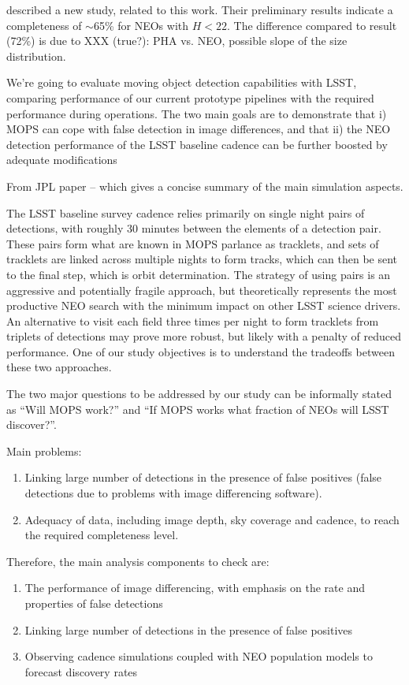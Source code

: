 \documentclass[12pt,preprint]{aastex}
\begin{document}
\cite{JPLstudy} described a new study, related to this work. Their preliminary results indicate a completeness
of $\sim$65\% for NEOs with $H<22$. The difference compared to \cite{JJI2016} result (72\%) is due 
to XXX (true?): PHA vs. NEO, possible slope of the size distribution. 


We're going to evaluate moving object detection capabilities with
LSST, comparing performance of our current prototype pipelines with 
the required performance during operations.  The two main goals are
to demonstrate that i) MOPS can cope with false detection in image differences,
and that ii) the NEO detection performance of the LSST baseline cadence can be
further boosted by adequate modifications 


From JPL paper -- which gives a concise summary of the main simulation aspects. 

The LSST baseline survey cadence relies primarily on single night pairs of detections, 
with roughly 30 minutes between the elements of a detection pair. These pairs form 
what are known in MOPS parlance as tracklets, and sets of tracklets are linked across 
multiple nights to form tracks, which can then be sent to the final step, which is orbit 
determination. The strategy of using pairs is an aggressive and potentially fragile
approach, but theoretically represents the most productive NEO search with the minimum 
impact on other LSST science drivers. An alternative to visit each field three times per 
night to form tracklets from triplets of detections may prove more robust, but likely 
with a penalty of reduced performance. One of our study objectives is to understand the
tradeoffs between these two approaches.

The two major questions to be addressed by our study can be informally stated as 
``Will MOPS work?'' and ``If MOPS works what fraction of NEOs will LSST discover?''. 

Main problems:
\begin{enumerate}
\item Linking large number of detections in the presence of false positives (false detections due to problems 
with image differencing software). 
\item Adequacy of data, including image depth, sky coverage and cadence, to reach the required 
completeness level. 
\end{enumerate} 

Therefore, the main analysis components to check are: 
\begin{enumerate}
\item The performance of image differencing, with emphasis on the rate and properties of 
   false detections 
\item Linking large number of detections in the presence of false positives 
\item Observing cadence simulations coupled with NEO population models to forecast 
        discovery rates 
\end{enumerate} 
\end{document}
